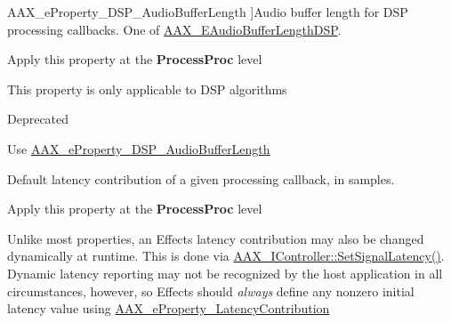 \begin{Desc}
\begin{description}
{\hypertarget{a00283_a6571f4e41a5dd06e4067249228e2249ea09fbd1cbcae0e86ad81005258dc1b67e}{}A\+A\+X\+\_\+e\+Property\+\_\+\+D\+S\+P\+\_\+\+Audio\+Buffer\+Length\label{a00283_a6571f4e41a5dd06e4067249228e2249ea09fbd1cbcae0e86ad81005258dc1b67e}
}]Audio buffer length for D\+S\+P processing callbacks. One of \hyperlink{a00206_ab33e0f1ecf04ca4161fa8d8de5845d67}{A\+A\+X\+\_\+\+E\+Audio\+Buffer\+Length\+D\+S\+P}. \begin{DoxyItemize}
\item Apply this property at the {\bfseries Process\+Proc} level \item This property is only applicable to D\+S\+P algorithms \end{DoxyItemize}
\item[{\em 
\hypertarget{a00283_a6571f4e41a5dd06e4067249228e2249ea34b1ae8c8edd3080aee6cd677bed9611}{}A\+A\+X\+\_\+e\+Property\+\_\+\+Audio\+Buffer\+Length\label{a00283_a6571f4e41a5dd06e4067249228e2249ea34b1ae8c8edd3080aee6cd677bed9611}
}]\begin{DoxyRefDesc}{Deprecated}
\item[\hyperlink{a00386__deprecated000017}{Deprecated}]Use \hyperlink{a00283_a6571f4e41a5dd06e4067249228e2249ea09fbd1cbcae0e86ad81005258dc1b67e}{A\+A\+X\+\_\+e\+Property\+\_\+\+D\+S\+P\+\_\+\+Audio\+Buffer\+Length} \end{DoxyRefDesc}
\item[{\em 
\hypertarget{a00283_a6571f4e41a5dd06e4067249228e2249eaa9037ffd2caf892bafe8f7f170548cb4}{}A\+A\+X\+\_\+e\+Property\+\_\+\+Latency\+Contribution\label{a00283_a6571f4e41a5dd06e4067249228e2249eaa9037ffd2caf892bafe8f7f170548cb4}
}]Default latency contribution of a given processing callback, in samples. \begin{DoxyItemize}
\item Apply this property at the {\bfseries Process\+Proc} level\end{DoxyItemize}
Unlike most properties, an Effect\textquotesingle{}s latency contribution may also be changed dynamically at runtime. This is done via \hyperlink{a00090_af2c648879419d94971c1308d8698601f}{A\+A\+X\+\_\+\+I\+Controller\+::\+Set\+Signal\+Latency()}. Dynamic latency reporting may not be recognized by the host application in all circumstances, however, so Effects should {\itshape always} define any nonzero initial latency value using \hyperlink{a00283_a6571f4e41a5dd06e4067249228e2249eaa9037ffd2caf892bafe8f7f170548cb4}{A\+A\+X\+\_\+e\+Property\+\_\+\+Latency\+Contribution}


\end{description}
\end{Desc}
